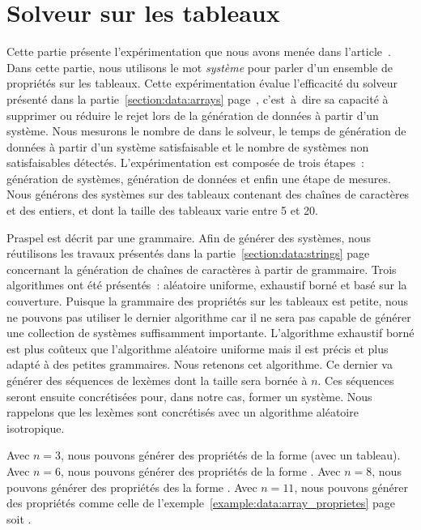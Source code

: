 \section{Solveur sur les tableaux}
\label{section:experimentation:solver}

Cette partie présente l'expérimentation que nous avons menée dans
l'article~. Dans cette partie, nous utilisons le mot {\em
système} pour parler d'un ensemble de propriétés sur les tableaux.  Cette
expérimentation évalue l'efficacité du solveur présenté dans la
partie~\ref{section:data:arrays} page~\pageref{section:data:arrays},
c'est~à~dire sa capacité à supprimer ou réduire le rejet lors de la génération
de données à partir d'un système. Nous mesurons le nombre de
 dans le solveur, le temps de génération de données à
partir d'un système satisfaisable et le nombre de systèmes non satisfaisables
détectés. L'expérimentation est composée de trois étapes~: génération de
systèmes, génération de données et enfin une étape de mesures. Nous générons des
systèmes sur des tableaux contenant des chaînes de caractères et des entiers, et
dont la taille des tableaux varie entre 5 et 20.

Praspel est décrit par une grammaire. Afin de générer des systèmes, nous
réutilisons les travaux présentés dans la partie~\ref{section:data:strings}
page~\pageref{section:data:strings} concernant la génération de chaînes de
caractères à partir de grammaire. Trois algorithmes ont été présentés~:
aléatoire uniforme, exhaustif borné et basé sur la couverture. Puisque la
grammaire des propriétés sur les tableaux est petite, nous ne pouvons pas
utiliser le dernier algorithme car il ne sera pas capable de générer une
collection de systèmes suffisamment importante. L'algorithme exhaustif borné est
plus coûteux que l'algorithme aléatoire uniforme mais il est précis et plus
adapté à des petites grammaires. Nous retenons cet algorithme. Ce dernier va
générer des séquences de lexèmes dont la taille sera bornée à $n$. Ces séquences
seront ensuite concrétisées pour, dans notre cas, former un système. Nous
rappelons que les lexèmes sont concrétisés avec un algorithme aléatoire
isotropique.

Avec $n = 3$, nous pouvons générer des propriétés de la forme 
(avec  un tableau). Avec $n = 6$, nous pouvons générer des propriétés de
la forme . Avec $n = 8$, nous pouvons générer des propriétés des
la forme . Avec $n = 11$, nous pouvons générer des propriétés
comme celle de l'exemple~\ref{example:data:array_proprietes}
page~\pageref{example:data:array_proprietes} soit .

